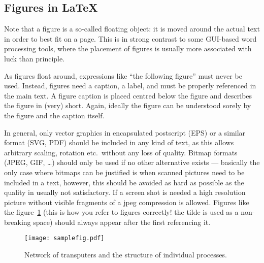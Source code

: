 \subsection{Figures in \LaTeX}
\label{sec:model:subsec:figures}
Note that a figure is a so-called floating object: it is moved around the actual text in order to best fit on a page. This is in strong contrast to some GUI-based word processing tools, where the placement of figures is usually more associated with luck than principle.

As figures float around, expressions like ``the following figure'' must never be used. Instead, figures need a caption, a label, and must be properly referenced in the main text. A figure caption is placed centred below the figure and describes the figure in (very) short. Again, ideally the figure can be understood sorely by the figure and the caption itself.

In general, only vector graphics in encapsulated postscript (EPS) or a similar format (SVG, PDF) should be included in any kind of text, as this allows arbitrary scaling, rotation etc.\ without any loss of quality. Bitmap formats (JPEG, GIF, \dots) should only be used if no other alternative exists --- basically the only case where bitmaps can be justified is when scanned pictures need to be included in a text, however, this should be avoided as hard as possible as the quality in usually not satisfactory. If a screen shot is needed a high resolution picture without visible fragments of a jpeg compression is allowed. Figures like the figure~\ref{fig:samplefig} (this is how you refer to figures correctly! the tilde is used as a non-breaking space) should always appear after the first referencing it.
\begin{figure}[hbtp]
	\centerline{\texttt{[image: samplefig.pdf]}}
	{\caption{Network of transputers and the structure of individual
			processes.}\label{fig:samplefig}}
\end{figure}